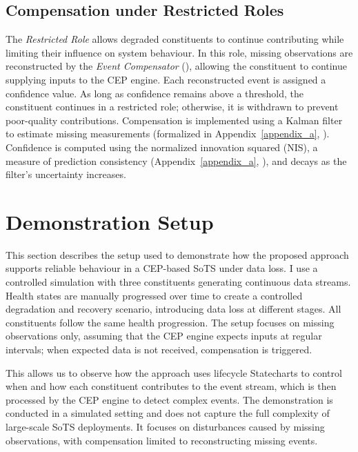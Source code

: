 \subsection{Compensation under Restricted Roles}\label{sec:demo-compensation}
The \textit{Restricted Role} allows degraded constituents to continue contributing while limiting their influence on system behaviour. In this role, missing observations are reconstructed by the \textit{Event Compensator} (), allowing the constituent to continue supplying inputs to the CEP engine. Each reconstructed event is assigned a confidence value. As long as confidence remains above a threshold, the constituent continues in a restricted role; otherwise, it is withdrawn to prevent poor-quality contributions. Compensation is implemented using a Kalman filter to estimate missing measurements (formalized in Appendix~\ref{appendix_a}, ). Confidence is computed using the normalized innovation squared (NIS), a measure of prediction consistency (Appendix~\ref{appendix_a}, ), and decays as the filter's uncertainty increases.

\section{Demonstration Setup}\label{sec:evaluation-setup}
This section describes the setup used to demonstrate how the proposed approach supports reliable behaviour in a CEP-based SoTS under data loss. I use a controlled simulation with three constituents generating continuous data streams. Health states are manually progressed over time to create a controlled degradation and recovery scenario, introducing data loss at different stages. All constituents follow the same health progression. The setup focuses on missing observations only, assuming that the CEP engine expects inputs at regular intervals; when expected data is not received, compensation is triggered.

This allows us to observe how the approach uses lifecycle Statecharts to control when and how each constituent contributes to the event stream, which is then processed by the CEP engine to detect complex events. The demonstration is conducted in a simulated setting and does not capture the full complexity of large-scale SoTS deployments. It focuses on disturbances caused by missing observations, with compensation limited to reconstructing missing events.

